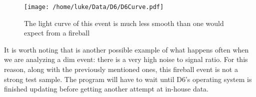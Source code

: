 \begin{figure}[ht!]
	\centering
	\texttt{[image: /home/luke/Data/D6/D6Curve.pdf]}
	\caption{The light curve of this event is much less smooth than one would expect from a fireball}
	\label{fig:D6LightCurve}
\end{figure}

It is worth noting that is another possible example of what happens often when we are analyzing a dim event: there is a very high noise to signal ratio. For this reason, along with the previously mentioned ones, this fireball event is not a strong test sample. The program will have to wait until D6's operating system is finished updating before getting another attempt at in-house data. 
